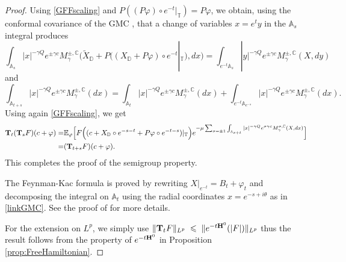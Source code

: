 \documentclass[11pt]{amsart}
\numberwithin{equation}{section}
\theoremstyle{definition}
\renewcommand{\tilde}{\widetilde}          %
\renewcommand{\leq}{\;\leqslant\;}                   %
\newcommand{\C}{\mathbb{C}}
\newcommand{\A}{\mathbb{A}}
\newcommand{\D}{\mathbb{D}}
\def\E{\mathbb{E}}
\def\T{\mathbb{T}}
\begin{document}
\begin{proof}
Using \eqref{GFFscaling} and $P((P\varphi)\circ e^{-t}|_{\T})=P\varphi$, we obtain, using the conformal covariance of the GMC \cite[Theorem 2.8]{Berestycki_lqggff}, that a change of variables $x=e^{t}y$ in the $\A_{s}$ integral produces
\[ \int_{\A_s}|x|^{-\gamma Q}e^{\pm \gamma c}M_\gamma^{\pm,\C}(\tilde{X}_\D+P((X_\D+P\varphi)\circ e^{-t}|_{\T}),dx)= \int_{e^{-t}\A_s}|y|^{-\gamma Q}e^{\pm \gamma c}M_\gamma^{\pm,\C}(X,dy)\]
and 
\[ \int_{\A_{t+s}}|x|^{-\gamma Q}e^{\pm \gamma c}M_\gamma^{\pm,\C}(dx)= 
\int_{\A_t}|x|^{-\gamma Q}e^{\pm \gamma c}M_\gamma^{\pm,\C}(dx)+ \int_{e^{-t}\A_{e^{-s}}}|x|^{-\gamma Q}e^{\pm \gamma c}M_\gamma^{\pm,\C}(dx).\]
Using again \eqref{GFFscaling}, we get 
\[\begin{split}
{\bf T}_t({\bf T}_sF)(c+\varphi)=&
 \E_\varphi\Big[ F\Big((c+X_{\D}\circ e^{-s-t}+P\varphi\circ e^{-t-s})|_{\T}\Big)e^{-\mu\sum_{\sigma = \pm 1}\int_{\A_{s+t}} |x|^{-\gamma Q}e^{\sigma \gamma c}M_\gamma^{\sigma,\C}(X,dx)}\Big]\\
 =& ({\bf T}_{t+s}F)(c+\varphi).
\end{split}\]
This completes the proof of the semigroup property. 

The Feynman-Kac formula is proved by rewriting $X|_{e^{-t}}=B_t+\varphi_t$ 
and decomposing the integral on $\A_t$ using the radial coordinates $x=e^{-s+i\theta}$ as in \eqref{linkGMC}. See the proof of 
\cite[Proposition 5.1]{GKRV} for more details.

For the extension on $L^p$, we simply use $\|{\bf T}_tF\|_{L^p}\leq \|e^{-t{\bf H}^0}(|F|)\|_{L^p}$ thus the result follows from the property of $e^{-t{\bf H}^0}$ in Proposition \ref{prop:FreeHamiltonian}.
\end{proof}
\end{document}

